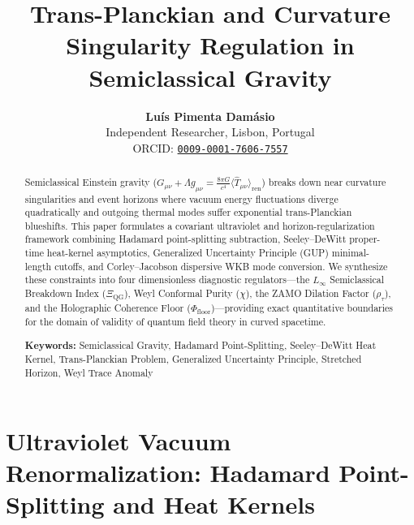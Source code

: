 \documentclass[11pt,a4paper]{article}
\title{\textbf{Trans-Planckian and Curvature Singularity Regulation in Semiclassical Gravity}}
\author{
    \textbf{Luís {Pimenta Damásio}} \\
    \small Independent Researcher, Lisbon, Portugal \\
    \small ORCID: \href{https://orcid.org/0009-0001-7606-7557}{\texttt{0009-0001-7606-7557}}
}
\date{}
\begin{document}
\maketitle

\begin{abstract}
Semiclassical Einstein gravity ($G_{\mu\nu} + \Lambda g_{\mu\nu} = \frac{8\pi G}{c^4} \langle \hat{T}_{\mu\nu} \rangle_{\text{ren}}$) breaks down near curvature singularities and event horizons where vacuum energy fluctuations diverge quadratically and outgoing thermal modes suffer exponential trans-Planckian blueshifts. This paper formulates a covariant ultraviolet and horizon-regularization framework combining Hadamard point-splitting subtraction, Seeley--DeWitt proper-time heat-kernel asymptotics, Generalized Uncertainty Principle (GUP) minimal-length cutoffs, and Corley--Jacobson dispersive WKB mode conversion. We synthesize these constraints into four dimensionless diagnostic regulators---the $L_\infty$ Semiclassical Breakdown Index ($\Xi_{\text{QG}}$), Weyl Conformal Purity ($\chi$), the ZAMO Dilation Factor ($\rho_\tau$), and the Holographic Coherence Floor ($\Phi_{\text{floor}}$)---providing exact quantitative boundaries for the domain of validity of quantum field theory in curved spacetime.

\vspace{0.5em}
\noindent\textbf{Keywords:} Semiclassical Gravity, Hadamard Point-Splitting, Seeley--DeWitt Heat Kernel, Trans-Planckian Problem, Generalized Uncertainty Principle, Stretched Horizon, Weyl Trace Anomaly
\end{abstract}

\vspace{0.5em}
\noindent{}
\vspace{1em}

\section{Ultraviolet Vacuum Renormalization: Hadamard Point-Splitting and Heat Kernels}
\end{document}
